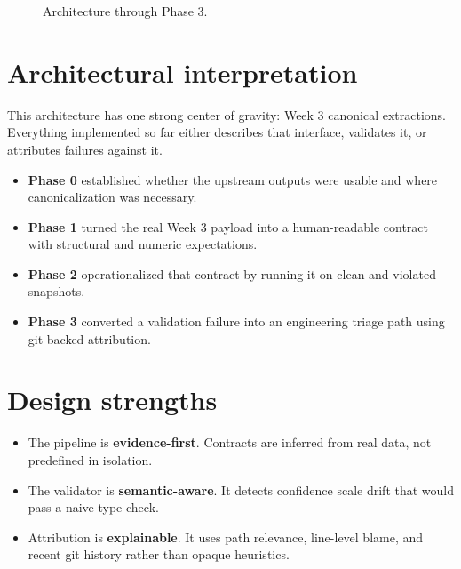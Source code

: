 \documentclass[11pt]{report}
\begin{document}
\begin{figure}[H]
{
}
\caption{Architecture through Phase 3.}
\end{figure}

\section{Architectural interpretation}
This architecture has one strong center of gravity: Week 3 canonical extractions. Everything implemented so far either describes that interface, validates it, or attributes failures against it.

\begin{itemize}[leftmargin=1.5em]
  \item \textbf{Phase 0} established whether the upstream outputs were usable and where canonicalization was necessary.
  \item \textbf{Phase 1} turned the real Week 3 payload into a human-readable contract with structural and numeric expectations.
  \item \textbf{Phase 2} operationalized that contract by running it on clean and violated snapshots.
  \item \textbf{Phase 3} converted a validation failure into an engineering triage path using git-backed attribution.
\end{itemize}

\section{Design strengths}
\begin{itemize}[leftmargin=1.5em]
  \item The pipeline is \textbf{evidence-first}. Contracts are inferred from real data, not predefined in isolation.
  \item The validator is \textbf{semantic-aware}. It detects confidence scale drift that would pass a naive type check.
  \item Attribution is \textbf{explainable}. It uses path relevance, line-level blame, and recent git history rather than opaque heuristics.
\end{itemize}
\end{document}
